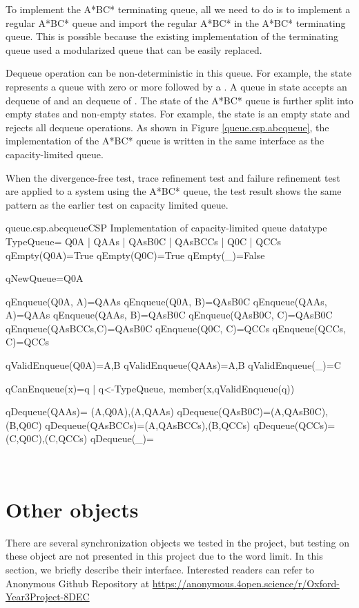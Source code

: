 \documentclass[a4paper, 12pt]{article}
\begin{document}
To implement the A*BC* terminating queue, all we need to do is to implement a regular A*BC* queue and import the regular A*BC* in the A*BC* terminating queue. This is possible because the existing implementation of the terminating queue used a modularized queue that can be easily replaced. 

Dequeue operation can be non-deterministic in this queue. For example, the state  represents a queue with zero or more  followed by a . A queue in state  accepts an dequeue of  and an dequeue of . The state of the A*BC* queue is further split into empty states and non-empty states. For example, the state  is an empty state and rejects all dequeue operations. As shown in Figure \ref{queue.csp.abcqueue}, the implementation of the A*BC* queue is written in the same interface as the capacity-limited queue.

When the divergence-free test, trace refinement test and failure refinement test are applied to a system using the A*BC* queue, the test result shows the same pattern as the earlier test on capacity limited queue. 
\begin{cspfloat}{queue.csp.abcqueue}{CSP Implementation of capacity-limited queue}
datatype TypeQueue= Q0A | QAAs | QAsB0C | QAsBCCs | Q0C  | QCCs
qEmpty(Q0A)=True
qEmpty(Q0C)=True
qEmpty(_)=False

qNewQueue=Q0A

qEnqueue(Q0A,    A)=QAAs
qEnqueue(Q0A,    B)=QAsB0C
qEnqueue(QAAs,   A)=QAAs
qEnqueue(QAAs,   B)=QAsB0C
qEnqueue(QAsB0C, C)=QAsB0C
qEnqueue(QAsBCCs,C)=QAsB0C
qEnqueue(Q0C,    C)=QCCs
qEnqueue(QCCs,   C)=QCCs

qValidEnqueue(Q0A)={A,B}
qValidEnqueue(QAAs)={A,B}
qValidEnqueue(_)={C}

qCanEnqueue(x)={q | q<-TypeQueue, member(x,qValidEnqueue(q))}

qDequeue(QAAs)=  {(A,Q0A),(A,QAAs)}
qDequeue(QAsB0C)={(A,QAsB0C),(B,Q0C)}
qDequeue(QAsBCCs)={(A,QAsBCCs),(B,QCCs)}
qDequeue(QCCs)={(C,Q0C),(C,QCCs)}
qDequeue(_)={}
\end{cspfloat}

\newpage⠀\newpage
\section{Other objects}
There are several synchronization objects we tested in the project, but testing on these object are not presented in this project due to the word limit. In this section, we briefly describe their interface. Interested readers can refer to Anonymous Github Repository at \url{https://anonymous.4open.science/r/Oxford-Year3Project-8DEC}
\end{document}
